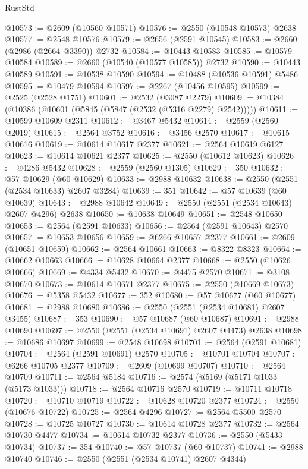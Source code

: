 \begin{lexlean}{RustStd}
\begin{coremodule}
@10573 := @2609 (@10560 @10571)
@10576 := @2550 (@10548 @10573) @2638
@10577 := @2548 @10576
@10579 := @2656 (@2591 @10545)
@10583 := @2660 (@2986 (@2664 @3390)) @2732
@10584 := @10443 @10583
@10585 := @10579 @10584
@10589 := @2660 (@10540 (@10577 @10585)) @2732
@10590 := @10443 @10589
@10591 := @10538 @10590
@10594 := @10488 (@10536 @10591) @5486
@10595 := @10479 @10594
@10597 := @2267 (@10456 @10595)
@10599 := @2525 (@2528 @1751)
@10601 := @2532 (@3087 @2279)
@10609 := @10384 (@10386 (@10601 (@5845 (@5847 (@2532 (@5316 @2279) @2542)))))
@10611 := @10599 @10609 @2311
@10612 := @3467 @5432
@10614 := @2559 (@2560 @2019)
@10615 := @2564 @3752
@10616 := @3456 @2570
@10617 := @10615 @10616
@10619 := @10614 @10617 @2377
@10621 := @2564 @10619 @6127
@10623 := @10614 @10621 @2377
@10625 := @2550 (@10612 @10623)
@10626 := @4286 @5432
@10628 := @2559 (@2560 @1305)
@10629 := 350
@10632 := @57 @10629 (@60 @10629)
@10633 := @2988 @10632
@10638 := @2550 (@2551 (@2534 @10633) @2607 @3284)
@10639 := 351
@10642 := @57 @10639 (@60 @10639)
@10643 := @2988 @10642
@10649 := @2550 (@2551 (@2534 @10643) @2607 @4296) @2638
@10650 := @10638 @10649
@10651 := @2548 @10650
@10653 := @2564 (@2591 @10633)
@10656 := @2564 (@2591 @10643) @2570
@10657 := @10653 @10656
@10659 := @6266 @10657 @2377
@10661 := @2609 (@10651 @10659)
@10662 := @2564 @10661
@10663 := @8322 @8323
@10664 := @10662 @10663
@10666 := @10628 @10664 @2377
@10668 := @2550 (@10626 @10666)
@10669 := @4334 @5432
@10670 := @4475 @2570
@10671 := @3108 @10670
@10673 := @10614 @10671 @2377
@10675 := @2550 (@10669 @10673)
@10676 := @5358 @5432
@10677 := 352
@10680 := @57 @10677 (@60 @10677)
@10681 := @2988 @10680
@10686 := @2550 (@2551 (@2534 @10681) @2607 @3455)
@10687 := 353
@10690 := @57 @10687 (@60 @10687)
@10691 := @2988 @10690
@10697 := @2550 (@2551 (@2534 @10691) @2607 @4473) @2638
@10698 := @10686 @10697
@10699 := @2548 @10698
@10701 := @2564 (@2591 @10681)
@10704 := @2564 (@2591 @10691) @2570
@10705 := @10701 @10704
@10707 := @6266 @10705 @2377
@10709 := @2609 (@10699 @10707)
@10710 := @2564 @10709
@10711 := @2564 @5184
@10716 := @2574 (@5169 (@5171 @1033 (@5173 @1033)))
@10718 := @2564 @10716 @2570
@10719 := @10711 @10718
@10720 := @10710 @10719
@10722 := @10628 @10720 @2377
@10724 := @2550 (@10676 @10722)
@10725 := @2564 @4296
@10727 := @2564 @5500 @2570
@10728 := @10725 @10727
@10730 := @10614 @10728 @2377
@10732 := @2564 @10730 @4477
@10734 := @10614 @10732 @2377
@10736 := @2550 (@5433 @10734)
@10737 := 354
@10740 := @57 @10737 (@60 @10737)
@10741 := @2988 @10740
@10746 := @2550 (@2551 (@2534 @10741) @2607 @4344)

\end{coremodule}
\end{lexlean}
